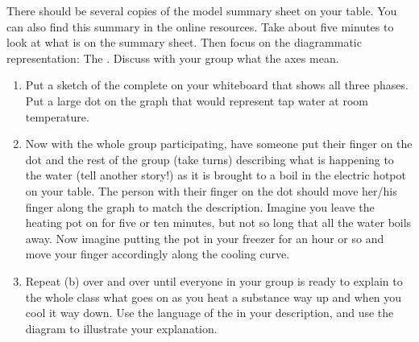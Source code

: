 \begin{benumerate}
		
	There should be several copies of the model summary sheet on your table. You can also find this summary in the online resources. Take about five minutes to look at what is on the summary sheet. Then focus on the diagrammatic representation: The \emph{\TempGraph{}}. Discuss with your group what the axes mean.
	
	

	\begin{enumerate}
		\item Put a sketch of the complete \TempGraph{} on your whiteboard that shows all three phases. Put a large dot on the graph that would represent tap water at room temperature.
		
		\item Now with the whole group participating, have someone put their finger on the dot and the rest of the group (take turns) describing what is happening to the water (tell another story!) as it is brought to a boil in the electric hotpot on your table. The person with their finger on the dot should move her/his finger along the graph to match the description. Imagine you leave the heating pot on for five or ten minutes, but not so long that all the water boils away. Now imagine putting the pot in your freezer for an hour or so and move your finger accordingly along the cooling curve.
		
		\item Repeat (b) over and over until everyone in your group is ready to explain to the whole class what goes on as you heat a substance way up and when you cool it way down. Use the language of the \ThreePhaseModel{} in your description, and use the diagram to illustrate your explanation.

\WCD

	\end{enumerate}


\end{benumerate}
